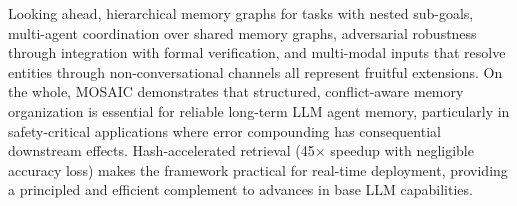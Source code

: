 \documentclass[10pt,twocolumn]{article}
\begin{document}
Looking ahead, hierarchical memory graphs for tasks with nested sub-goals, multi-agent coordination over shared memory graphs, adversarial robustness through integration with formal verification, and multi-modal inputs that resolve entities through non-conversational channels all represent fruitful extensions. On the whole, MOSAIC demonstrates that structured, conflict-aware memory organization is essential for reliable long-term LLM agent memory, particularly in safety-critical applications where error compounding has consequential downstream effects. Hash-accelerated retrieval (45$\times$ speedup with negligible accuracy loss) makes the framework practical for real-time deployment, providing a principled and efficient complement to advances in base LLM capabilities.



\end{document}
